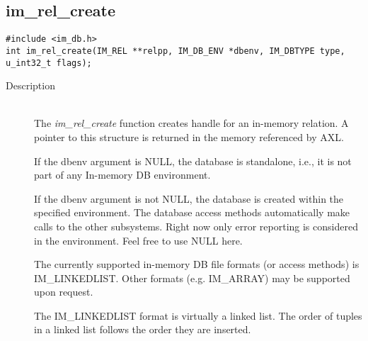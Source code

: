 \documentclass[11pt]{article}
\begin{document}
\subsection{im\_rel\_create}
\begin{verbatim}
#include <im_db.h>
int im_rel_create(IM_REL **relpp, IM_DB_ENV *dbenv, IM_DBTYPE type, u_int32_t flags);
\end{verbatim}
\begin{description}
\item[Description]\ \\
  The {\em im\_rel\_create} function creates handle for an in-memory
  relation.  A pointer to this structure is returned in the memory
  referenced by AXL.

  If the dbenv argument is NULL, the database is standalone, i.e., it
  is not part of any In-memory DB environment.

  If the dbenv argument is not NULL, the database is created within
  the specified environment. The database access methods automatically
  make calls to the other subsystems. Right now only error reporting
  is considered in the environment.  Feel free to use NULL here.

  The currently supported in-memory DB file formats (or access methods)
  is IM\_LINKED\-LIST.  Other formats (e.g. IM\_ARRAY) may be
  supported upon request.
  
  The IM\_LINKEDLIST format is virtually a linked list.  The order of
  tuples in a linked list follows the order they are inserted.
  

\end{description}
\end{document}
